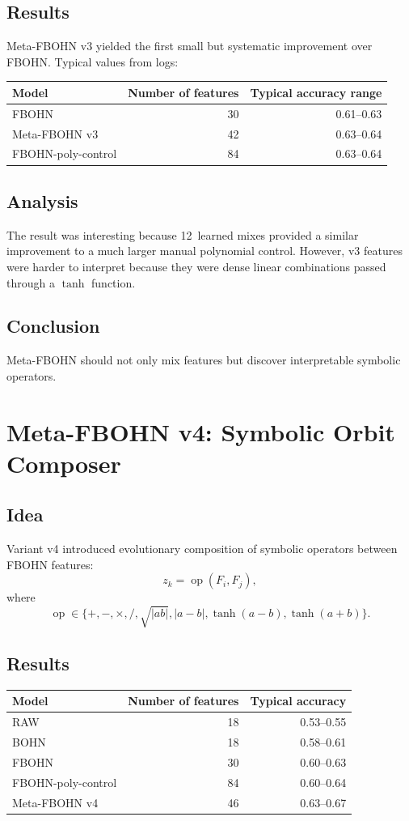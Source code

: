 \documentclass[11pt,a4paper]{report}
\begin{document}
\subsection{Results}
Meta-FBOHN v3 yielded the first small but systematic improvement over FBOHN. Typical values from logs:
\begin{center}
\begin{tabular}{lrr}
\toprule
Model & Number of features & Typical accuracy range\\
\midrule
FBOHN & 30 & 0.61--0.63\\
Meta-FBOHN v3 & 42 & 0.63--0.64\\
FBOHN-poly-control & 84 & 0.63--0.64\\
\bottomrule
\end{tabular}
\end{center}

\subsection{Analysis}
The result was interesting because 12~learned mixes provided a similar improvement to a much larger manual polynomial control. However, v3 features were harder to interpret because they were dense linear combinations passed through a $\tanh$ function.

\subsection{Conclusion}
Meta-FBOHN should not only mix features but discover interpretable symbolic operators.


\section{Meta-FBOHN v4: Symbolic Orbit Composer}
\label{sec:meta_fbohn_v4}

\subsection{Idea}
Variant v4 introduced evolutionary composition of symbolic operators between FBOHN features:
\[
z_k=\operatorname{op}(F_i,F_j),
\]
where
\[
\operatorname{op}\in\{+,-,\times,/,\sqrt{|ab|},|a-b|,\tanh(a-b),\tanh(a+b)\}.
\]

\subsection{Results}
\begin{center}
\begin{tabular}{lrr}
\toprule
Model & Number of features & Typical accuracy\\
\midrule
RAW & 18 & 0.53--0.55\\
BOHN & 18 & 0.58--0.61\\
FBOHN & 30 & 0.60--0.63\\
FBOHN-poly-control & 84 & 0.60--0.64\\
Meta-FBOHN v4 & 46 & 0.63--0.67\\
\bottomrule
\end{tabular}
\end{center}
\end{document}
